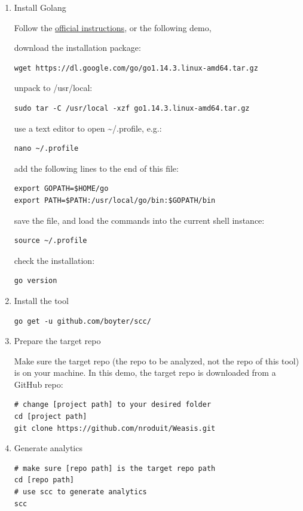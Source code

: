\documentclass[letterpaper,cleveref]{lipics-v2019}
\begin{document}
\begin{enumerate}
\item Install Golang

Follow the \href{https://golang.org/doc/install}{official instructions}, or the
following demo,

download the installation package:
\begin{lstlisting}
wget https://dl.google.com/go/go1.14.3.linux-amd64.tar.gz
\end{lstlisting}
    
unpack to /usr/local:
\begin{lstlisting}
sudo tar -C /usr/local -xzf go1.14.3.linux-amd64.tar.gz
\end{lstlisting}

use a text editor to open \textasciitilde/.profile, e.g.:
\begin{lstlisting}
nano ~/.profile
\end{lstlisting}

add the following lines to the end of this file:
\begin{lstlisting}
export GOPATH=$HOME/go
export PATH=$PATH:/usr/local/go/bin:$GOPATH/bin
\end{lstlisting}

save the file, and load the commands into the current shell instance:
\begin{lstlisting}
source ~/.profile
\end{lstlisting}

check the installation:
\begin{lstlisting}
go version
\end{lstlisting}

\item Install the tool
\begin{lstlisting}
go get -u github.com/boyter/scc/
\end{lstlisting}
    
\item Prepare the target repo

Make sure the target repo (the repo to be analyzed, not the repo of this tool)
is on your machine.
In this demo, the target repo is downloaded from a GitHub repo:
\begin{lstlisting}
# change [project path] to your desired folder
cd [project path]
git clone https://github.com/nroduit/Weasis.git
\end{lstlisting}

\item Generate analytics
\begin{lstlisting}
# make sure [repo path] is the target repo path
cd [repo path]
# use scc to generate analytics
scc
\end{lstlisting}
    

\end{enumerate}
\end{document}

